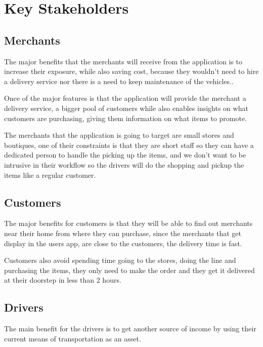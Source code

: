 \section{Key Stakeholders}

\subsection{Merchants}
The major benefits that the merchants will receive from the application is to 
increase their exposure, while also saving cost, because they wouldn't need to 
hire a delivery service nor there is a need to keep maintenance 
of the vehicles..\newline

\noindent Once of the major features is that the application will provide the 
merchant a delivery service, a bigger pool of customers while also enables 
insights on what customers are purchasing, giving them information on what 
items to promote.\newline

\noindent The merchants that the application is going to target are small 
stores and boutiques, one of their constraints is that they are short staff so 
they can have a dedicated person to handle the picking up the items, and we 
don’t want to be intrusive in their workflow so the drivers will do the 
shopping and pickup the items like a regular customer.

\subsection{Customers}
The major benefits for customers is that they will be able to find out 
merchants near their home from where they can purchase, since the merchants 
that get display in the users app, are close to the customers, the delivery 
time is fast.\newline

\noindent Customers also avoid spending time going to the stores, doing the 
line and purchasing the items, they only need to make the order and they get 
it delivered at their doorstep in less than 2 hours.

\pagebreak

\subsection{Drivers}
The main benefit for the drivers is to get another source of income by using 
their current means of transportation as an asset. \newline

